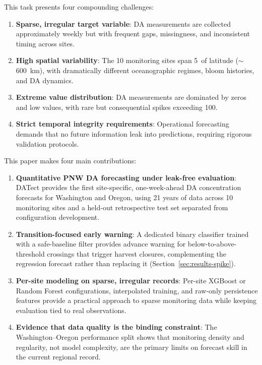 \documentclass[toxins,article,submit,moreauthors]{Definitions/mdpi}
\begin{document}
This task presents four compounding challenges:
\begin{enumerate}[nosep]
    \item \textbf{Sparse, irregular target variable}: DA measurements are collected approximately weekly but with frequent gaps, missingness, and inconsistent timing across sites.
    \item \textbf{High spatial variability}: The 10 monitoring sites span 5\textdegree\ of latitude ($\sim$\SI{600}{\kilo\meter}), with dramatically different oceanographic regimes, bloom histories, and DA dynamics.
    \item \textbf{Extreme value distribution}: DA measurements are dominated by zeros and low values, with rare but consequential spikes exceeding \SI{100}{\microgrampeg}.
    \item \textbf{Strict temporal integrity requirements}: Operational forecasting demands that no future information leak into predictions, requiring rigorous validation protocols.
\end{enumerate}

This paper makes four main contributions:
\begin{enumerate}[nosep]
    \item \textbf{Quantitative PNW DA forecasting under leak-free evaluation}: DATect provides the first site-specific, one-week-ahead DA concentration forecasts for Washington and Oregon, using 21 years of data across 10 monitoring sites and a held-out retrospective test set separated from configuration development.
    \item \textbf{Transition-focused early warning}: A dedicated binary classifier trained with a safe-baseline filter provides advance warning for below-to-above-threshold crossings that trigger harvest closures, complementing the regression forecast rather than replacing it (Section~\ref{sec:results-spike}).
    \item \textbf{Per-site modeling on sparse, irregular records}: Per-site XGBoost or Random Forest configurations, interpolated training, and raw-only persistence features provide a practical approach to sparse monitoring data while keeping evaluation tied to real observations.
    \item \textbf{Evidence that data quality is the binding constraint}: The Washington--Oregon performance split shows that monitoring density and regularity, not model complexity, are the primary limits on forecast skill in the current regional record.
\end{enumerate}
\end{document}

